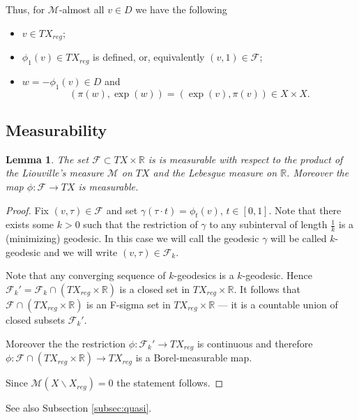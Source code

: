 \documentclass[12pt,leqno,intlimits]{amsart}
\numberwithin{equation}{section}
\newtheorem{lem}[thm]{Lemma}
\theoremstyle{definition}
\theoremstyle{remark}
\newcommand{\R}{\mathbb{R}}
\def\:{\colon}
\begin{document}
Thus, for $\mathcal M$-almost all $v\in D$ we have the following
\begin{itemize}
\item $v\in TX_{reg}$;
\item $\phi _1(v) \in TX_{reg}$ is defined, or, equivalently $(v,1)\in \mathcal F$;
\item $w=-\phi_1 (v)\in D$ and
\begin{equation} \label{eq:symm}
(\pi (w), \exp (w))=(\exp (v), \pi (v)) \in X\times X.
\end{equation}
\end{itemize}

{\color{red}

\subsection{Measurability} \label{subsec:measur}

\begin{lem}\label{lem:measurability}
The set $\mathcal F\subset TX\times \R$ is 
is measurable with respect to the product of the Liouville's measure $\mathcal M$ on $TX$ and the Lebesgue measure on $\R$.
Moreover the map $\phi \:\mathcal F \to TX$ is measurable.
\end{lem}

\begin{proof}
Fix $(v,\tau)\in \mathcal F$ and set $\gamma(\tau\cdot t)=\phi_t(v)$, $t\in[0,1]$.
Note that there exists some $k>0$ such that the restriction of $\gamma$ to any subinterval of length $\frac 1 k$ is a (minimizing) geodesic.
In this case we will call the geodesic $\gamma$ will be called $k$-geodesic and 
we will write $(v,\tau)\in \mathcal F_k$.

Note that any converging sequence of $k$-geodesics is a $k$-geodesic.
Hence $\mathcal F_k'=\mathcal F_k\cap (TX_{reg} \times \R)$ is a closed set in $TX_{reg} \times \R$.
It follows that $\mathcal F\cap (TX_{reg} \times \R)$ is an F-sigma set in $TX_{reg} \times \R$ --- it is a countable union of closed subsets $\mathcal F_k'$.

Moreover the the restriction $\phi\: \mathcal F_k' \to TX_{reg}$ is continuous and therefore
$\phi \:\mathcal F\cap (TX_{reg} \times \R) \to TX_{reg}$ is a Borel-measurable map.

Since $\mathcal M(X\backslash X_{reg})=0$ the statement follows. 
\end{proof}

See also Subsection \ref{subsec:quasi}.
}
\end{document}
